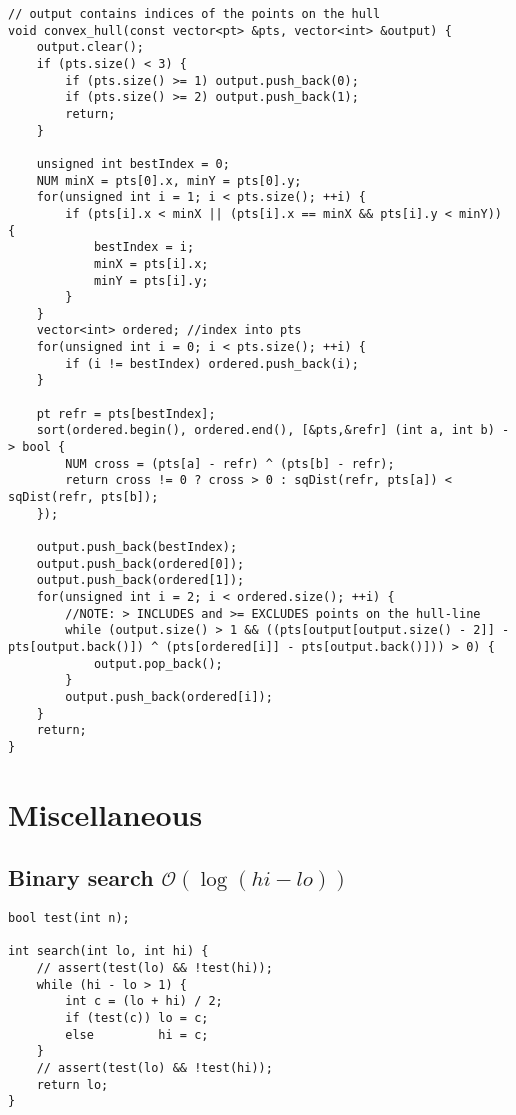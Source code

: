\documentclass{article}
\begin{document}
\begin{lstlisting}
// output contains indices of the points on the hull
void convex_hull(const vector<pt> &pts, vector<int> &output) {
	output.clear();
	if (pts.size() < 3) {
		if (pts.size() >= 1) output.push_back(0);
		if (pts.size() >= 2) output.push_back(1);
		return;
	}

	unsigned int bestIndex = 0;
	NUM minX = pts[0].x, minY = pts[0].y;
	for(unsigned int i = 1; i < pts.size(); ++i) {
		if (pts[i].x < minX || (pts[i].x == minX && pts[i].y < minY)) {
			bestIndex = i;
			minX = pts[i].x;
			minY = pts[i].y;
		}
	}
	vector<int> ordered; //index into pts
	for(unsigned int i = 0; i < pts.size(); ++i) {
		if (i != bestIndex) ordered.push_back(i);
	}

	pt refr = pts[bestIndex];
	sort(ordered.begin(), ordered.end(), [&pts,&refr] (int a, int b) -> bool {
		NUM cross = (pts[a] - refr) ^ (pts[b] - refr);
		return cross != 0 ? cross > 0 : sqDist(refr, pts[a]) < sqDist(refr, pts[b]);
	});
	
	output.push_back(bestIndex);
	output.push_back(ordered[0]);
	output.push_back(ordered[1]);
	for(unsigned int i = 2; i < ordered.size(); ++i) {
		//NOTE: > INCLUDES and >= EXCLUDES points on the hull-line
		while (output.size() > 1 && ((pts[output[output.size() - 2]] - pts[output.back()]) ^ (pts[ordered[i]] - pts[output.back()])) > 0) {
			output.pop_back();
		}
		output.push_back(ordered[i]);
	}
	return;
}

\end{lstlisting}

\section{Miscellaneous}
\subsection{Binary search $\mathcal{O}(\log (hi - lo))$}

\begin{lstlisting}
bool test(int n);

int search(int lo, int hi) {
	// assert(test(lo) && !test(hi));
	while (hi - lo > 1) {
		int c = (lo + hi) / 2;
		if (test(c)) lo = c;
		else         hi = c;
	}
	// assert(test(lo) && !test(hi));
	return lo;
}
\end{lstlisting}

\begin{comment}
\end{minipage}\hfill
\begin{minipage}{.45\textwidth}
	\begin{lstlisting}[title={Inclusive, Inclusive}]
bool test(int n);
	
int lo = 0, hi = n - 1;
// assert(test(lo) && !test(hi + 1));
while (lo < hi) {
	int mid = (lo + hi + 1) / 2;
	if (test(mid)) lo = mid;
	else hi = mid - 1;
}
return lo;
	\end{lstlisting}
\end{minipage}
\end{comment}
\end{document}

